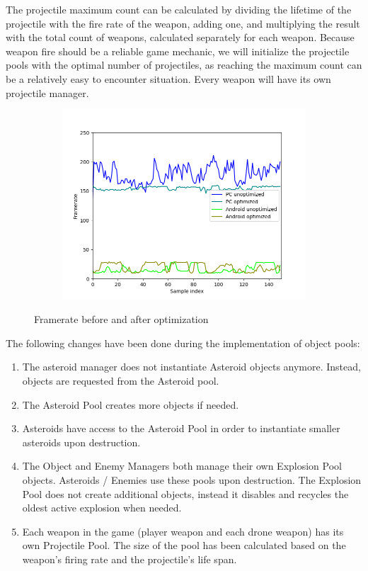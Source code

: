  The projectile maximum count can be calculated by dividing the lifetime of the projectile with the fire rate of the weapon, adding one, and multiplying the result with the total count of weapons, calculated separately for each weapon. Because weapon fire should be a reliable game mechanic, we will initialize the projectile pools with the optimal number of projectiles, as reaching the maximum count can be a relatively easy to encounter situation. Every weapon will have its own projectile manager.\begin{figure}
\begin{subfigure}{0.49\textwidth}
\includegraphics[width = \textwidth, height = 0.66\textwidth]{images/pools}
\end{subfigure}
\caption{Framerate before and after optimization}
\end{figure}
The following changes have been done during the implementation of object pools:
\begin{enumerate}
\item{The asteroid manager does not instantiate Asteroid objects anymore. Instead, objects are requested from the Asteroid pool.}
\item{The Asteroid Pool creates more objects if needed.}
\item{Asteroids have access to the Asteroid Pool in order to instantiate smaller asteroids upon destruction.}
\item{The Object and Enemy Managers both manage their own Explosion Pool objects. Asteroids / Enemies use these pools upon destruction. The Explosion Pool does not create additional objects, instead it disables and recycles the oldest active explosion when needed.}
\item{Each weapon in the game (player weapon and each drone weapon) has its own Projectile Pool. The size of the pool has been calculated based on the weapon's firing rate and the projectile's life span.}
\end{enumerate}
